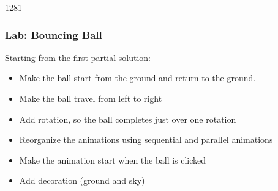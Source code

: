 
\begin{slide}{1281}\frametitle{Lab: Bouncing Ball}


Starting from the first partial solution:

\begin{itemize}
\item Make the ball start from the ground and return to the ground.
\item Make the ball travel from left to right
\item Add rotation, so the ball completes just over one rotation
\item Reorganize the animations using sequential and parallel animations
\item Make the animation start when the ball is clicked
\item Add decoration (ground and sky)
\end{itemize}

\end{slide}
